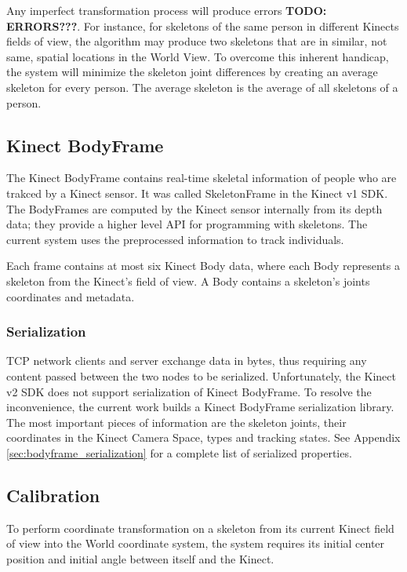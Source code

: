 \documentclass{sigchi}
\begin{document}
Any imperfect transformation process will produce errors \textbf{TODO: ERRORS???}. For instance, for skeletons of the same person in different Kinects fields of view, the algorithm may produce two skeletons that are in similar, not same, spatial locations in the World View. To overcome this inherent handicap, the system will minimize the skeleton joint differences by creating an average skeleton for every person. The average skeleton is the average of all skeletons of a person.

\subsection{Kinect BodyFrame}

The Kinect BodyFrame contains real-time skeletal information of people who are trakced by a Kinect sensor. It was called SkeletonFrame in the Kinect v1 SDK. The BodyFrames are computed by the Kinect sensor internally from its depth data; they provide a higher level API for programming with skeletons. The current system uses the preprocessed information to track individuals.

Each frame contains at most six Kinect Body data, where each Body represents a skeleton from the Kinect's field of view. A Body contains a skeleton's joints coordinates and metadata.

\subsubsection{Serialization}

TCP network clients and server exchange data in bytes, thus requiring any content passed between the two nodes to be serialized. Unfortunately, the Kinect v2 SDK does not support serialization of Kinect BodyFrame. To resolve the inconvenience, the current work builds a Kinect BodyFrame serialization library. The most important pieces of information are the skeleton joints, their coordinates in the Kinect Camera Space, types and tracking states. See Appendix \ref{sec:bodyframe_serialization} for a complete list of serialized properties.

\subsection{Calibration}

To perform coordinate transformation on a skeleton from its current Kinect field of view into the World coordinate system, the system requires its initial center position and initial angle between itself and the Kinect.  
\end{document}
